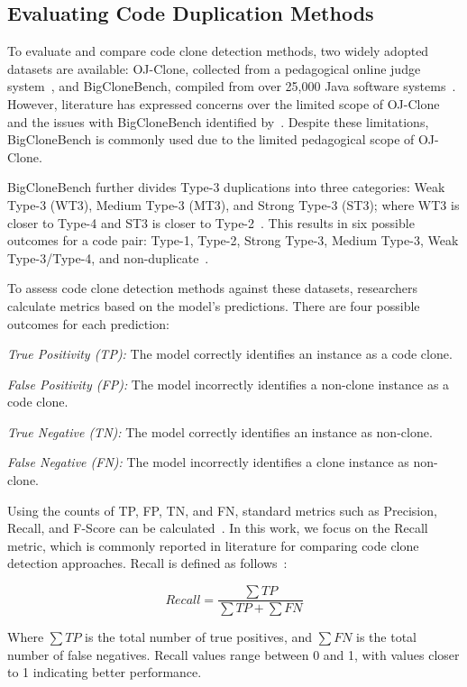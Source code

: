 \subsection{Evaluating Code Duplication Methods}

\label{subsec:codemethods}

To evaluate and compare code clone detection methods, two widely adopted
datasets are available: OJ-Clone, collected from a pedagogical online judge
system~\citep{ojclone}, and BigCloneBench, compiled from over 25,000 Java
software systems~\citep{bigclonebench}. However, literature has expressed
concerns over the limited scope of OJ-Clone and the issues with BigCloneBench
identified by~\cite{bigfail}. Despite these
limitations, BigCloneBench is commonly used due to the limited pedagogical
scope of OJ-Clone.

BigCloneBench further divides Type-3 duplications into three categories: Weak
Type-3 (WT3), Medium Type-3 (MT3), and Strong Type-3 (ST3); where WT3 is closer
to Type-4 and ST3 is closer to Type-2~\citep{bigclonebench}. This results in
six possible outcomes for a code pair: Type-1, Type-2, Strong Type-3, Medium
Type-3, Weak Type-3/Type-4, and non-duplicate~\citep{bigclonebench}.

To assess code clone detection methods against these datasets, researchers
calculate metrics based on the model’s predictions. There are four possible
outcomes for each prediction:

\begin{itemize}
    \begin{item}
        \textit{True Positivity (TP):} The model correctly identifies an instance as a code clone.
    \end{item}
    \begin{item}
        \textit{False Positivity (FP):} The model incorrectly identifies a non-clone instance as a code clone.
    \end{item}
    \begin{item}
        \textit{True Negative (TN):} The model correctly identifies an instance as non-clone.
    \end{item}
    \begin{item}
        \textit{False Negative (FN):} The model incorrectly identifies a clone instance as non-clone.
    \end{item}
\end{itemize}

Using the counts of TP, FP, TN, and FN, standard metrics such as Precision,
Recall, and F-Score can be calculated~\citep{recall}. In this work, we focus on
the Recall metric, which is commonly reported in literature for comparing code
clone detection approaches. Recall is defined as follows~\citep{recall}:

$$Recall = \frac{\sum TP}{\sum TP + \sum FN }$$

Where $\sum TP$ is the total number of true positives, and $\sum FN$ is the
total number of false negatives. Recall values range between 0 and 1, with
values closer to 1 indicating better performance.

